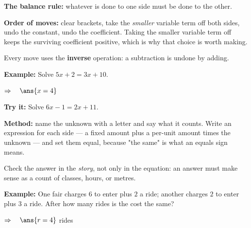 \documentclass[12pt]{article}
\begin{document}


\begin{formulabox}
\textbf{The balance rule:} whatever is done to one side must be done to the other.
\par\smallskip
\textbf{Order of moves:} clear brackets, take the \emph{smaller} variable term off both
sides, undo the constant, undo the coefficient. Taking the smaller variable term off keeps
the surviving coefficient positive, which is why that choice is worth making.
\par\smallskip
Every move uses the \textbf{inverse} operation: a subtraction is undone by adding.
\end{formulabox}

\begin{examplebox}
\textbf{Example:} \quad Solve $5x + 2 = 3x + 10$.

$\Rightarrow\quad \ans{x = 4}$
\end{examplebox}

\begin{tryitbox}
\textbf{Try it:} \quad Solve $6x - 1 = 2x + 11$.\\[2pt]
\end{tryitbox}


\begin{formulabox}
\textbf{Method:} name the unknown with a letter and say what it counts. Write an
expression for each side --- a fixed amount plus a per-unit amount times the unknown ---
and set them equal, because "the same" is what an equals sign means.
\par\smallskip
Check the answer in the \emph{story}, not only in the equation: an answer must make sense
as a count of classes, hours, or metres.
\end{formulabox}

\begin{examplebox}
\textbf{Example:} \quad One fair charges $6$ to enter plus $2$ a ride; another charges $2$
to enter plus $3$ a ride. After how many rides is the cost the same?

$\Rightarrow\quad \ans{r = 4}$ rides
\end{examplebox}
\end{document}
